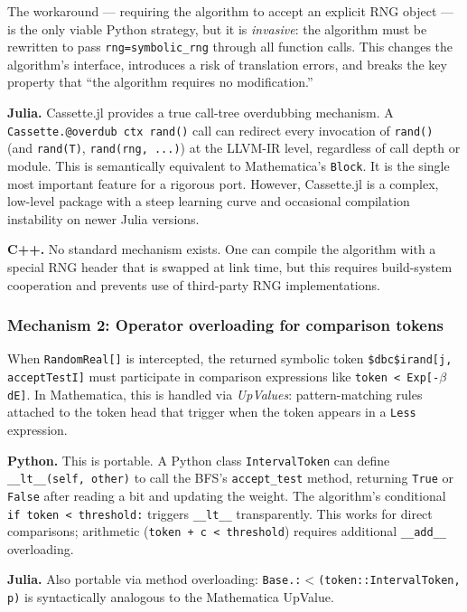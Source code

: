 \documentclass[12pt,a4paper]{article}
\theoremstyle{critical}
\theoremstyle{remark}
\theoremstyle{verified}
\begin{document}
The workaround --- requiring the algorithm to accept an explicit RNG object --- is
the only viable Python strategy, but it is \emph{invasive}: the algorithm must be
rewritten to pass \texttt{rng=symbolic\_rng} through all function calls.  This
changes the algorithm's interface, introduces a risk of translation errors, and
breaks the key property that ``the algorithm requires no modification.''

\textbf{Julia.}  Cassette.jl provides a true call-tree overdubbing mechanism.  A
\texttt{Cassette.@overdub ctx rand()} call can redirect every invocation of
\texttt{rand()} (and \texttt{rand(T)}, \texttt{rand(rng, ...)}) at the LLVM-IR
level, regardless of call depth or module.  This is semantically equivalent to
Mathematica's \texttt{Block}.  It is the single most important feature for a
rigorous port.  However, Cassette.jl is a complex, low-level package with a steep
learning curve and occasional compilation instability on newer Julia versions.

\textbf{C++.}  No standard mechanism exists.  One can compile the algorithm with a
special RNG header that is swapped at link time, but this requires build-system
cooperation and prevents use of third-party RNG implementations.

\subsubsection{Mechanism 2: Operator overloading for comparison tokens}

When \texttt{RandomReal[]} is intercepted, the returned symbolic token
\texttt{\$dbc\$irand[j, acceptTestI]} must participate in comparison expressions
like \texttt{token < Exp[-$\beta$ dE]}.  In Mathematica, this is handled via
\emph{UpValues}: pattern-matching rules attached to the token head that trigger
when the token appears in a \texttt{Less} expression.

\textbf{Python.}  This is portable.  A Python class \texttt{IntervalToken} can
define \texttt{\_\_lt\_\_(self, other)} to call the BFS's \texttt{accept\_test}
method, returning \texttt{True} or \texttt{False} after reading a bit and updating
the weight.  The algorithm's conditional
\texttt{if token < threshold:} triggers \texttt{\_\_lt\_\_} transparently.  This
works for direct comparisons; arithmetic (\texttt{token + c < threshold}) requires
additional \texttt{\_\_add\_\_} overloading.

\textbf{Julia.}  Also portable via method overloading:
\texttt{Base.:$<$(token::IntervalToken, p)} is syntactically analogous to the
Mathematica UpValue.
\end{document}
